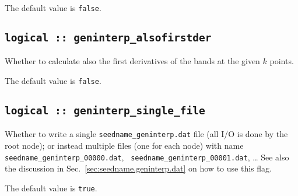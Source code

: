 The default value is \verb#false#.

\subsection[geninterp\_alsofirstder]{\tt logical :: geninterp\_alsofirstder}
Whether to calculate also the first derivatives of the bands at the
given $k$ points.

The default value is \verb#false#.

\subsection[geninterp\_alsofirstder]{\tt logical :: geninterp\_single\_file}
Whether to write a single  {\tt seedname\_geninterp.dat} file (all I/O is done by the root node); or
instead multiple files (one for each node) with
name {\tt seedname\_geninterp\_00000.dat}, {\tt
  seedname\_geninterp\_00001.dat}, \ldots
See also the discussion in Sec.~\ref{sec:seedname.geninterp.dat} on
how to use this flag.

The default value is \verb#true#.
